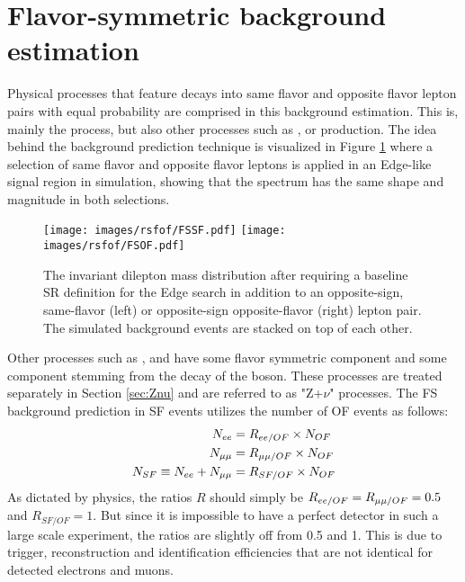 \section{Flavor-symmetric background estimation}\label{sec:fsBG}
\noindent
\justify
Physical processes that feature decays into same flavor and opposite flavor lepton pairs with equal probability are comprised in this background estimation. 
This is, mainly the \ttbar process, but also other processes such as \PWW, or \ttW production.
The idea behind the background prediction technique is visualized in Figure \ref{fig:rsfofMC} where a selection of same flavor and opposite flavor leptons is applied in an Edge-like signal region in simulation, showing that the \ttbar spectrum has the same shape and magnitude in both selections.    
\begin{figure}[htbp!]
\begin{center}
    \texttt{[image: images/rsfof/FSSF.pdf]}
    \texttt{[image: images/rsfof/FSOF.pdf]} 
    \caption{The invariant dilepton mass distribution after requiring a baseline SR definition for the Edge search in addition to an opposite-sign, same-flavor (left) or opposite-sign opposite-flavor (right) lepton pair. The simulated background events are stacked on top of each other.}
\label{fig:rsfofMC}
\end{center}
\end{figure}                                                                               
Other processes such as \PWZ, \PZZ and \ttZ have some flavor symmetric component and some component stemming from the decay of the \PZ boson.
These processes are treated separately in Section \ref{sec:Znu} and are referred to as "Z+$\nu$" processes. 
The FS background prediction in SF events utilizes the number of OF events as follows:
\begin{align}
\label{eq:masterformula}
    N_{ee} & = R_{ee/OF} \times N_{OF}\notag \\
    N_{\mu\mu} & = R_{\mu\mu/OF} \times N_{OF}\notag\\
    N_{SF} \equiv N_{ee} + N_{\mu\mu} & = R_{SF/OF} \times N_{OF}
\end{align}
As dictated by physics, the ratios $R$ should simply be $R_{ee/OF}=R_{\mu\mu/OF}=0.5$ and $R_{SF/OF}=1$.
But since it is impossible to have a perfect detector in such a large scale experiment, the ratios are slightly off from 0.5 and 1. 
This is due to trigger, reconstruction and identification efficiencies that are not identical for detected electrons and muons. 
